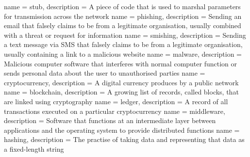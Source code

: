 {
        name 			= stub,
        description	= {A piece of code that is used to marshal parameters for transmission across the network}
}
{
        name 			= phishing,
        description	= {Sending an email that falsely claims to be from a legitimate organisation, usually combined with a threat or request for information}
}
{
        name			= smishing,
        description 	= {Sending a text message via SMS that falsely claims to be from a legitimate organisation, usually containing a link to a malicious website}
}
{
        name			= malware,
        description	= {Malicious computer software that interferes with normal computer function or sends personal data about the user to unauthorised parties}
}
{
        name			= cryptocurrency,
        description	= {A digital currency produces by a public network}
}
{
        name			= blockchain,
        description	= {A growing list of records, called blocks, that are linked using cryptography}
}
{
        name			= ledger,
        description	= {A record of all transactions executed on a particular cryptocurrency}
}
{
        name			= middleware,
        description	= {Software that functions at an intermediate layer between applications and the operating system to provide distributed functions}
}
{
        name			= hashing,
        description	= {The practise of taking data and representing that data as a fixed-length string}
}
